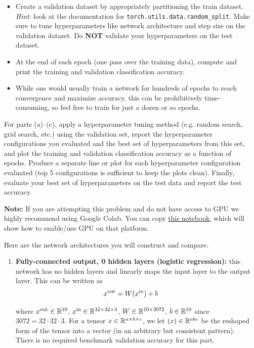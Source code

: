 \documentclass{article}
\begin{document}
\begin{bprob}
\begin{itemize}
  \item Create a validation dataset by appropriately partitioning the train dataset. \emph{Hint}: look at the documentation for \texttt{torch.utils.data.random\_split}. Make sure to tune hyperparameters like network architecture and step size on the validation dataset. Do \textbf{NOT} validate your hyperparameters on the test dataset.
  \item At the end of each epoch (one pass over the training data), compute and print the training and validation classification accuracy.
  \item While one would usually train a network for hundreds of epochs to reach convergence and maximize accuracy, this can be prohibitively time-consuming, so feel free to train for just a dozen or so epochs. 
\end{itemize}

For parts (a)--(c), apply a hyperparameter tuning method (e.g. random search, grid search, etc.) using the validation set, report the hyperparameter configurations you evaluated and the best set of hyperparameters from this set, and plot the training and validation classification accuracy as a function of epochs. Produce a separate line or plot for each hyperparameter configuration evaluated (top 5 configurations is sufficient to keep the plots clean). Finally, evaluate your best set of hyperparameters on the test data and report the test accuracy. 

\textbf{Note:} If you are attempting this problem and do not have access to GPU we highly recommend using Google Colab. You can copy \href{https://colab.research.google.com/drive/16CcFW4q3wJyym5yAl2qdn9uDXkn2MgHx?usp=sharing}{this notebook}, which will show how to enable/use GPU on that platform.

\vspace{0.1in}
Here are the network architectures you will construct and compare.
\begin{enumerate}
  \item {} \textbf{Fully-connected output, 0 hidden layers (logistic regression):} this network has no hidden layers and linearly maps the input layer to the output layer. This can be written as 
  \begin{align*}
    x^\text{out} &= W \mathbf{(}x^\text{in}) +b
  \end{align*} 
  
  where $x^\text{out} \in \mathbb{R}^{10}$, $x^\text{in} \in \mathbb{R}^{32 \times 32 \times 3}$, $W \in \mathbb{R}^{10 \times 3072}$, $b \in \mathbb{R}^{10}$ since $3072 = 32 \cdot 32 \cdot 3$. For a tensor $x \in \mathbb{R}^{a \times b \times c}$, we let $\mathbf{(}x) \in \mathbb{R}^{a b c}$ be the reshaped form of the tensor into a vector (in an arbitrary but consistent pattern). 
  There is no required benchmark validation accuracy for this part.


\end{enumerate}
\end{bprob}
\end{document}
